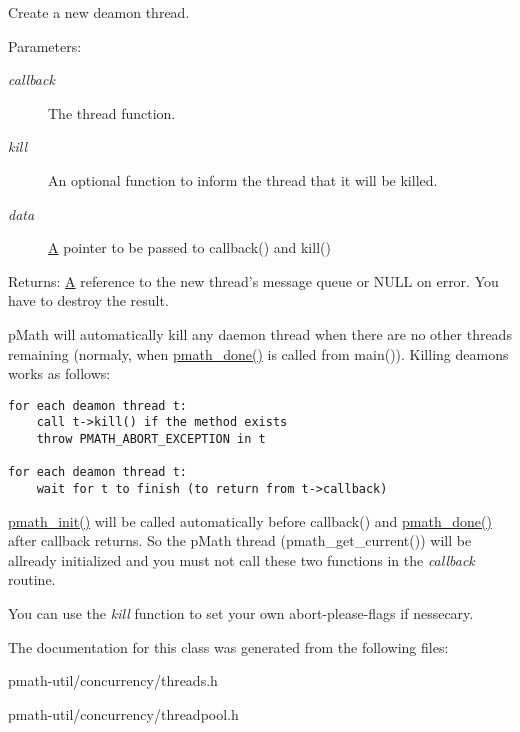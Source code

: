 Create a new deamon thread. 

\begin{Desc}
\item[Parameters:]
\begin{description}
\item[{\em callback}]The thread function. \item[{\em kill}]An optional function to inform the thread that it will be killed. \item[{\em data}]\hyperlink{class_a}{A} pointer to be passed to callback() and kill() \end{description}
\end{Desc}
\begin{Desc}
\item[Returns:]\hyperlink{class_a}{A} reference to the new thread's message queue or NULL on error. You have to destroy the result.\end{Desc}
pMath will automatically kill any daemon thread when there are no other threads remaining (normaly, when \hyperlink{group__frontend_g012705e1fd248a7cebf738bae6375dd9}{pmath\_\-done()} is called from main()). Killing deamons works as follows:



\begin{Code}\begin{verbatim}for each deamon thread t:
    call t->kill() if the method exists
    throw PMATH_ABORT_EXCEPTION in t
    
for each deamon thread t:
    wait for t to finish (to return from t->callback)
\end{verbatim}
\end{Code}



\hyperlink{group__frontend_gfb9f2c789bee5295c6794d16c0164943}{pmath\_\-init()} will be called automatically before callback() and \hyperlink{group__frontend_g012705e1fd248a7cebf738bae6375dd9}{pmath\_\-done()} after callback returns. So the pMath thread (pmath\_\-get\_\-current()) will be allready initialized and you must not call these two functions in the {\em callback\/} routine.

You can use the {\em kill\/} function to set your own abort-please-flags if nessecary. 

The documentation for this class was generated from the following files:\begin{CompactItemize}
\item 
pmath-util/concurrency/threads.h\item 
pmath-util/concurrency/threadpool.h\end{CompactItemize}
